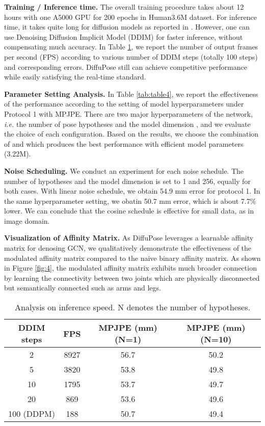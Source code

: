 \documentclass[letterpaper, 10 pt, conference]{ieeeconf}
\begin{document}
\noindent\textbf{Training / Inference time.}
The overall training procedure takes about 12 hours with one A5000 GPU for 200 epochs in Human3.6M dataset.
For inference time, it takes quite long for diffusion models as reported in \cite{song2020denoising}. However, one can use Denoising Diffusion Implicit Model (DDIM) \cite{song2020denoising} for faster inference, without compensating much accuracy. 
In Table \ref{tab:table6}, we report the number of output frames per second (FPS) according to various number of DDIM steps (totally 100 steps) and corresponding errors. DiffuPose still can achieve competitive performance while easily satisfying the real-time standard.


\noindent\textbf{Parameter Setting Analysis.}
In Table \ref{tab:table4}, we report the effectiveness of the performance according to the setting of model hyperparameters under Protocol 1 with MPJPE.
There are two major hyperparameters of the network, \textit{i.e.} the number of pose hypotheses and the model dimension , and we evaluate the choice of each configuration.
Based on the results, we choose the combination of  and  which produces the best performance with efficient model parameters (3.22M).

\noindent\textbf{Noise Scheduling.}
We conduct an experiment for each noise schedule.
The number of hypotheses and the model dimension is set to 1 and 256, equally for both cases.
With linear noise schedule\cite{ho2020denoising}, we obtain 54.9 mm error for protocol 1.
In the same hyperparameter setting, we obatin 50.7 mm error, which is about 7.7\% lower. We can conclude that the cosine schedule is effective for small data, as in image domain.

\noindent\textbf{Visualization of Affinity Matrix.}
As DiffuPose leverages a learnable affinity matrix for denosing GCN, we qualitatively demonstrate the effectiveness of the modulated affinity matrix compared to the naive binary affinity matrix.
As shown in Figure \ref{fig:4}, the modulated affinity matrix exhibits much broader connection by learning the connectivity between two joints which are physically disconnected but semantically connected such as arms and legs.

\begin{table}[h]
    \centering
    \resizebox{0.45\textwidth}{!}
    {
    \begin{tabular}{c|c|c|c}
    \toprule
        DDIM steps & FPS & MPJPE (mm) (N=1) & MPJPE (mm) (N=10) \\
    \midrule
         2 & 8927 & 56.7 & 50.2\\
         5 & 3820 & 53.8 & 49.8\\
         10 & 1795 & 53.7 & 49.7\\
         20 & 869 & 53.6 & 49.6\\
         100 (DDPM) & 188 & 50.7 & 49.4\\

    \bottomrule
    \end{tabular}
    }
    \caption{Analysis on inference speed. N denotes the number of hypotheses.}
    \vspace{-20pt}
    \label{tab:table6}
\end{table} 
%
 
\end{document}

